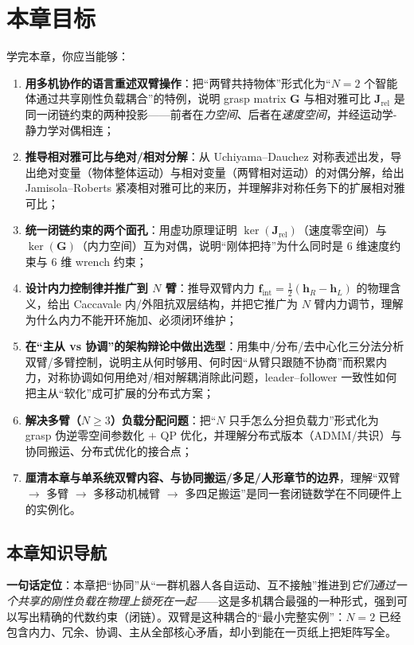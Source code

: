 \section*{本章目标}
学完本章，你应当能够：
\begin{enumerate}
  \item \textbf{用多机协作的语言重述双臂操作}：把“两臂共持物体”形式化为“$N=2$ 个智能体通过共享刚性负载耦合”的特例，说明 grasp matrix $\mathbf{G}$ 与相对雅可比 $\mathbf{J}_{\text{rel}}$ 是同一闭链约束的两种投影——前者在\emph{力空间}、后者在\emph{速度空间}，并经运动学-静力学对偶相连；
  \item \textbf{推导相对雅可比与绝对/相对分解}：从 Uchiyama--Dauchez 对称表述出发，导出绝对变量（物体整体运动）与相对变量（两臂相对运动）的对偶分解，给出 Jamisola--Roberts 紧凑相对雅可比的来历，并理解非对称任务下的扩展相对雅可比；
  \item \textbf{统一闭链约束的两个面孔}：用虚功原理证明 $\ker(\mathbf{J}_{\text{rel}})$（速度零空间）与 $\ker(\mathbf{G})$（内力空间）互为对偶，说明“刚体把持”为什么同时是 $6$ 维速度约束与 $6$ 维 wrench 约束；
  \item \textbf{设计内力控制律并推广到 $N$ 臂}：推导双臂内力 $\mathbf{f}_{\text{int}}=\tfrac12(\mathbf{h}_R-\mathbf{h}_L)$ 的物理含义，给出 Caccavale 内/外阻抗双层结构，并把它推广为 $N$ 臂内力调节，理解为什么内力不能开环施加、必须闭环维护；
  \item \textbf{在“主从 vs 协调”的架构辩论中做出选型}：用集中/分布/去中心化三分法分析双臂/多臂控制，说明主从何时够用、何时因“从臂只跟随不协商”而积累内力，对称协调如何用绝对/相对解耦消除此问题，leader--follower 一致性如何把主从“软化”成可扩展的分布式方案；
  \item \textbf{解决多臂（$N\ge 3$）负载分配问题}：把“$N$ 只手怎么分担负载力”形式化为 grasp 伪逆零空间参数化 $+$ QP 优化，并理解分布式版本（ADMM/共识）与协同搬运、分布式优化的接合点；
  \item \textbf{厘清本章与单系统双臂内容、与协同搬运/多足/人形章节的边界}，理解“双臂 $\to$ 多臂 $\to$ 多移动机械臂 $\to$ 多四足搬运”是同一套闭链数学在不同硬件上的实例化。
\end{enumerate}

\subsection*{本章知识导航}
\textbf{一句话定位}：本章把“协同”从“一群机器人各自运动、互不接触”推进到\emph{它们通过一个共享的刚性负载在物理上锁死在一起}——这是多机耦合最强的一种形式，强到可以写出精确的代数约束（闭链）。双臂是这种耦合的“最小完整实例”：$N=2$ 已经包含内力、冗余、协调、主从全部核心矛盾，却小到能在一页纸上把矩阵写全。

